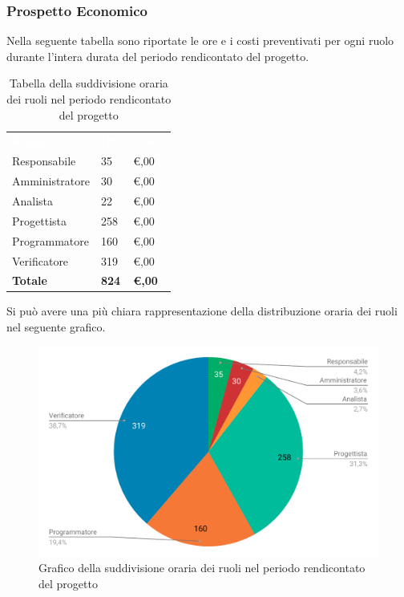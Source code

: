 \subsubsection{Prospetto Economico}
Nella seguente tabella sono riportate le ore e i costi preventivati per ogni ruolo durante l'intera durata del periodo rendicontato del progetto.


\begin{table}[H]	
	\begin{center}
	    \begin{tabular}{C{4cm}C{1cm}C{3,5cm}}
			\textcolor{white}{\textbf{Ruolo}} & \textcolor{white}{\textbf{Ore}} & \textcolor{white}{\textbf{Costo}}
			\\
			Responsabile & 35 & \euro {},00 \\
			Amministratore & 30 & \euro {},00 \\
			Analista & 22 & \euro {},00 \\
			Progettista & 258 & \euro {},00 \\
			Programmatore & 160 & \euro {},00 \\
			Verificatore & 319 & \euro {},00 \\
			\textbf{Totale} & \textbf{824} & \textbf{\euro {},00} \\
		\end{tabular}
	    \caption{Tabella della suddivisione oraria dei ruoli nel periodo rendicontato del progetto} \label{tab:tabellaRuoliTotale} 
	\end{center}
\end{table}


Si può avere una più chiara rappresentazione della distribuzione oraria dei ruoli nel seguente grafico.

\begin{figure}[H]
	\includegraphics[width=1\linewidth]{Preventivo/grafici/TR2.pdf}
	\caption{Grafico della suddivisione oraria dei ruoli nel periodo rendicontato del progetto}
\end{figure}

